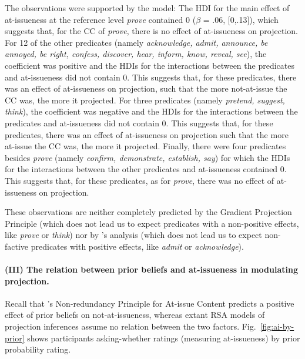 \documentclass[11pt,fleqn]{article}
\newcommand{\6}{\mbox{$[\hspace*{-.6mm}[$}}
\newcommand{\9}{\mbox{$]\hspace*{-.6mm}]$}}
\newcommand{\citepos}[1]{\citeauthor{#1}'s \citeyear{#1}}
\begin{document}
The observations were supported by the model: The HDI for the main effect of at-issueness at the reference level {\em prove} contained 0 ($\beta$ = .06, [0,.13]), which suggests that, for the CC of {\em prove}, there is no effect of at-issueness on projection. For 12 of the other predicates (namely {\em acknowledge, admit, announce, be annoyed, be right, confess, discover, hear, inform, know, reveal, see}), the coefficient was positive and the HDIs for the interactions between the predicates and at-issueness did not contain 0. This suggests that, for these predicates, there was an effect of at-issueness on projection, such that the more not-at-issue the CC was, the more it projected. For three predicates (namely {\em pretend, suggest, think}), the coefficient was negative and the HDIs for the interactions between the predicates and at-issueness did not contain 0. This suggests that, for these predicates, there was an effect of at-issueness on projection such that the more at-issue the CC was, the more it projected. Finally, there were four predicates besides {\em prove} (namely {\em confirm, demonstrate, establish, say}) for which the HDIs for the interactions between the other predicates and at-issueness contained 0. This suggests that, for these predicates, as for \emph{prove}, there was no effect of at-issueness on projection. 

These observations are neither completely predicted by the Gradient Projection Principle (which does not lead us to expect predicates with a non-positive effects, like {\em prove} or {\em think}) nor by \citepos{djaerv-bacovcin2020} analysis (which does not lead us to expect non-factive predicates with positive effects, like {\em admit} or {\em acknowledge}).


\paragraph{(III) The relation between prior beliefs and at-issueness in modulating projection.} Recall that \citepos{tonhauser-etal-eval} Non-redundancy Principle for At-issue Content predicts a positive effect of prior beliefs on not-at-issueness, whereas extant RSA models of projection inferences assume no relation between the two factors. Fig.~\ref{fig:ai-by-prior} shows participants asking-whether ratings (measuring at-issueness) by prior probability rating. 
\end{document}
